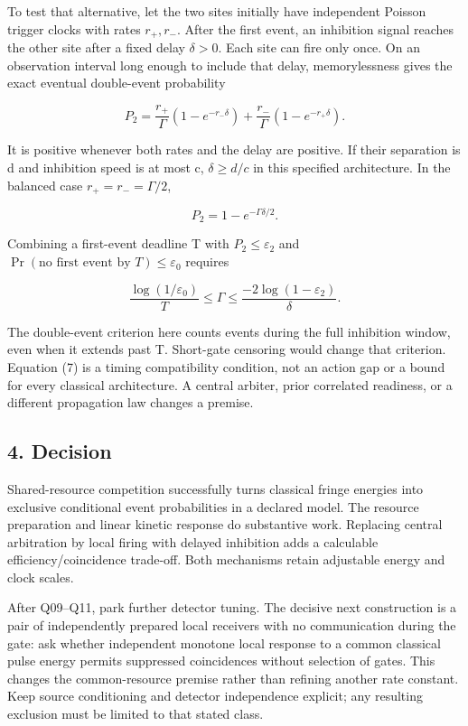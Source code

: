 \documentclass[11pt,a4paper]{article}
\begin{document}
To test that alternative, let the two sites initially have independent
Poisson trigger clocks with rates \(r_+,r_-\). After the first event, an
inhibition signal reaches the other site after a fixed delay
\(\delta>0\). Each site can fire only once. On an observation interval
long enough to include that delay, memorylessness gives the exact
eventual double-event probability

\[P_2=\frac{r_+}{\Gamma}(1-e^{-r_-\delta})+
       \frac{r_-}{\Gamma}(1-e^{-r_+\delta}). \tag{5}\]

It is positive whenever both rates and the delay are positive. If their
separation is d and inhibition speed is at most c, \(\delta\ge d/c\) in
this specified architecture. In the balanced case \(r_+=r_-=\Gamma/2\),

\[P_2=1-e^{-\Gamma\delta/2}. \tag{6}\]

Combining a first-event deadline T with \(P_2\le\varepsilon_2\) and
\(\Pr(\text{no first event by }T)\le\varepsilon_0\) requires

\[\frac{\log(1/\varepsilon_0)}{T}\le\Gamma
\le\frac{-2\log(1-\varepsilon_2)}{\delta}. \tag{7}\]

The double-event criterion here counts events during the full inhibition
window, even when it extends past T. Short-gate censoring would change
that criterion. Equation (7) is a timing compatibility condition, not an
action gap or a bound for every classical architecture. A central
arbiter, prior correlated readiness, or a different propagation law
changes a premise.

\hypertarget{decision}{%
\subsection{4. Decision}\label{decision}}

Shared-resource competition successfully turns classical fringe energies
into exclusive conditional event probabilities in a declared model. The
resource preparation and linear kinetic response do substantive work.
Replacing central arbitration by local firing with delayed inhibition
adds a calculable efficiency/coincidence trade-off. Both mechanisms
retain adjustable energy and clock scales.

After Q09--Q11, park further detector tuning. The decisive next
construction is a pair of independently prepared local receivers with no
communication during the gate: ask whether independent monotone local
response to a common classical pulse energy permits suppressed
coincidences without selection of gates. This changes the
common-resource premise rather than refining another rate constant. Keep
source conditioning and detector independence explicit; any resulting
exclusion must be limited to that stated class.
\end{document}
